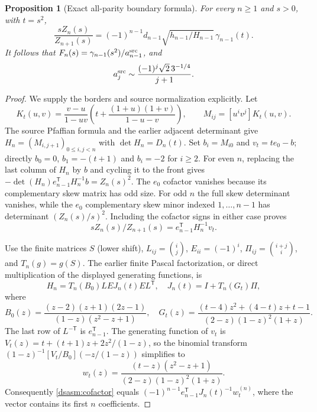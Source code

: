 \documentclass[11pt,letterpaper]{article}
\newtheorem{proposition}[theorem]{Proposition}
\theoremstyle{remark}\newtheorem{remark}[theorem]{Remark}
\begin{document}
\begin{proposition}[Exact all-parity boundary formula]\label{dsasm:prop:boundary}
For every $n\ge1$ and $s>0$, with $t=s^2$,
\begin{equation}\label{dsasm:boundaryexact}
 \frac{sZ_n(s)}{Z_{n+1}(s)}
 =(-1)^{n-1}d_{n-1}\sqrt{h_{n-1}/H_{n-1}}\,\gamma_{n-1}(t).
\end{equation}
It follows that $F_n(s)=\gamma_{n-1}(s^2)/a_{n-1}^{\rm src}$, and
\begin{equation}\label{dsasm:calcoefficient}
 a_j^{\rm src}\sim\frac{(-1)^j\sqrt2\,3^{-1/4}}{j+1}.
\end{equation}
\end{proposition}
\begin{proof}
We supply the borders and source normalization explicitly.
Let
\[
 K_t(u,v)=\frac{v-u}{1-uv}
       \left(t+\frac{(1+u)(1+v)}{1-u-v}\right),\qquad
 M_{ij}=[u^iv^j]K_t(u,v).
\]
The source Pfaffian formula \cite[Equation (4.1)]{bfk}
and the earlier adjacent determinant give
$H_n=(M_{i,j+1})_{0\le i,j<n}$ with $\det H_n=D_n(t)$.
Set $b_i=M_{i0}$ and $v_t=te_0-b$; directly
$b_0=0$, $b_1=-(t+1)$ and $b_i=-2$ for $i\ge2$.
For even $n$, replacing the last column of $H_n$ by $b$ and cycling
it to the front gives
$-\det(H_n)e_{n-1}^{\mathsf T}H_n^{-1}b=Z_n(s)^2$.
The $e_0$ cofactor vanishes because its complementary skew matrix
has odd size. For odd $n$ the full skew determinant vanishes, while
the $e_0$ complementary skew minor indexed $1,\ldots,n-1$ has
determinant $(Z_n(s)/s)^2$. Including the cofactor signs in either
case proves
\begin{equation}\label{dsasm:cofactor}
 sZ_n(s)/Z_{n+1}(s)=e_{n-1}^{\mathsf T}H_n^{-1}v_t.
\end{equation}

Use the finite matrices $S$ (lower shift), $L_{ij}=\binom ij$,
$E_{ii}=(-1)^i$, $\Pi_{ij}=\binom{i+j}{i}$, and $T_n(g)=g(S)$.
The earlier finite Pascal factorization, or direct multiplication
of the displayed generating functions, is
\[
 H_n=T_n(B_0)LEJ_n(t)EL^{\mathsf T},\quad
 J_n(t)=I+T_n(G_t)\Pi,
\]
where
\[
 B_0(z)=\frac{(z-2)(z+1)(2z-1)}{(1-z)(z^2-z+1)},\quad
 G_t(z)=\frac{(t-4)z^2+(4-t)z+t-1}{(2-z)(1-z)^2(1+z)}.
\]
The last row of $L^{-\mathsf T}$ is $e_{n-1}^{\mathsf T}$.
The generating function of $v_t$ is $V_t(z)=t+(t+1)z+2z^2/(1-z)$,
so the binomial transform
$(1-z)^{-1}[V_t/B_0](-z/(1-z))$ simplifies to
\[
 w_t(z)=\frac{(t-z)(z^2-z+1)}{(2-z)(1-z)^2(1+z)}.
\]
Consequently \eqref{dsasm:cofactor} equals
$(-1)^{n-1}e_{n-1}^{\mathsf T}J_n(t)^{-1}w_t^{(n)}$,
where the vector contains its first $n$ coefficients.


\end{proof}
\end{document}
